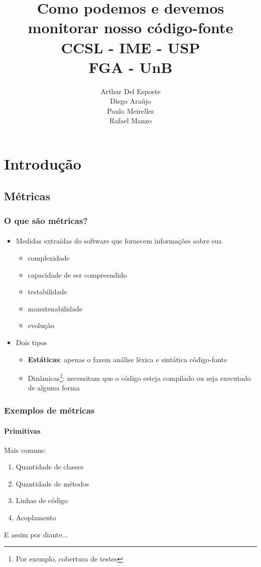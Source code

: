 \documentclass{beamer}
\title{
       \textbf{Como podemos e devemos monitorar nosso código-fonte} \\
       CCSL - IME - USP\\
       FGA - UnB
      }
\author{
        Arthur Del Esposte \\
        Diego Araújo \\
        Paulo Meirelles \\
        Rafael Manzo
       }
\begin{document}
\maketitle

\section{Introdução}
  \subsection{Métricas}
  \begin{frame}
    \frametitle{O que são métricas?}
    \framesubtitle{}

    \begin{itemize}
      \item Medidas extraídas do software que fornecem informações sobre sua
        \begin{itemize}
          \item complexidade
          \item capacidade de ser compreendido
          \item testabilidade
          \item manutenabilidade
          \item evolução
        \end{itemize}
      \item Dois tipos
        \begin{itemize}
          \item \textbf{Estáticas}: apenas o fazem análise léxica e sintática código-fonte
          \item Dinâmicas\footnote{Por exemplo, cobertura de testes}: necessitam que o código esteja compilado ou seja executado de alguma forma
        \end{itemize}
    \end{itemize}
  \end{frame}

  \begin{frame}
    \frametitle{Exemplos de métricas}
    \framesubtitle{Primitivas}

    Mais comuns:
    \begin{enumerate}
      \item Quantidade de classes
      \item Quantidade de métodos
      \item Linhas de código
      \item Acoplamento
    \end{enumerate}

    E assim por diante...
  \end{frame}
\end{document}
